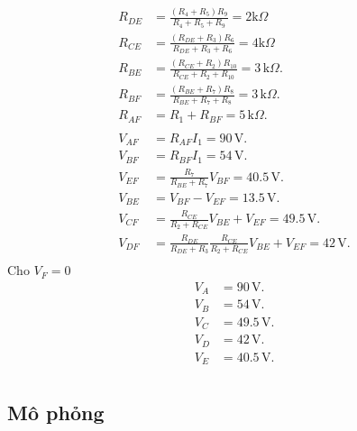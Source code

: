 \begin{align*}
    R_{DE} & = \frac{(R_4 + R_5)R_9}{R_4 + R_5 + R_9} = 2 \text{k}\Omega                            \\
    R_{CE} & = \frac{(R_{DE} + R_3)R_6}{R_{DE} + R_3 + R_6} = 4 \text{k}\Omega                      \\
    R_{BE} & = \frac{(R_{CE} + R_2) R_{10}}{R_{CE} + R_{2} + R_{10}} = 3 \, \text{k}\Omega.         \\
    R_{BF} & = \frac{(R_{BE} + R_{7}) R_{8}}{R_{BE} + R_{7} + R_{8}} = 3 \, \text{k}\Omega.         \\
    R_{AF} & = R_{1} + R_{BF} = 5 \, \text{k}\Omega.                                                \\ \\
%
    V_{AF} & = R_{AF} I_1 = 90 \, \text{V}.                                                         \\
    V_{BF} & = R_{BF}I_1 = 54 \, \text{V}.                                                          \\
    V_{EF} & = \frac{R_{7}}{R_{BE} + R_{7}} V_{BF} = 40.5 \, \text{V}.                               \\
    V_{BE} & = V_{BF} - V_{EF} = 13.5 \, \text{V}.                                                        \\
    V_{CF} & = \frac{R_{CE}}{R_{2} + R_{CE}} V_{BE} + V_{EF} = 49.5 \, \text{V}.                             \\
    V_{DF} & = \frac{R_{DE}}{R_{DE} + R_{3}} \frac{R_{CE}}{R_{2} + R_{CE}} V_{BE} + V_{EF} = 42 \, \text{V}. \\
\end{align*}
%
Cho \(V_F = 0\)
%
\begin{align*}
    V_{A} & = 90 \, \text{V}.   \\
    V_{B} & = 54 \, \text{V}.   \\
    V_{C} & = 49.5 \, \text{V}. \\
    V_{D} & = 42 \, \text{V}.   \\
    V_{E} & = 40.5 \, \text{V}. \\
\end{align*}

\pagebreak

\subsection{Mô phỏng}

